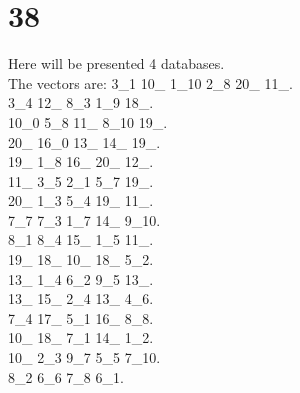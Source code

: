 \chapter{38}
\indent Here will be presented 4 databases.\\
The vectors are:
3\_1 10\_ 1\_10 2\_8 20\_ 11\_.\\3\_4 12\_ 8\_3 1\_9 18\_.\\10\_0 5\_8 11\_ 8\_10 19\_.\\20\_ 16\_0 13\_ 14\_ 19\_.\\19\_ 1\_8 16\_ 20\_ 12\_.\\11\_ 3\_5 2\_1 5\_7 19\_.\\20\_ 1\_3 5\_4 19\_ 11\_.\\7\_7 7\_3 1\_7 14\_ 9\_10.\\8\_1 8\_4 15\_ 1\_5 11\_.\\19\_ 18\_ 10\_ 18\_ 5\_2.\\13\_ 1\_4 6\_2 9\_5 13\_.\\13\_ 15\_ 2\_4 13\_ 4\_6.\\7\_4 17\_ 5\_1 16\_ 8\_8.\\10\_ 18\_ 7\_1 14\_ 1\_2.\\10\_ 2\_3 9\_7 5\_5 7\_10.\\8\_2 6\_6 7\_8 6\_1.\\